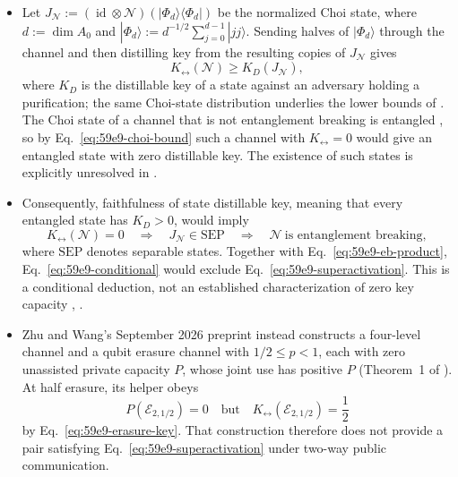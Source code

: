 \begin{itemize}
  \item Let $J_{\mathcal N}:=(\operatorname{id}\otimes\mathcal N)(|\Phi_d\rangle\langle\Phi_d|)$
  be the normalized Choi state, where $d:=\dim A_0$ and
  $|\Phi_d\rangle:=d^{-1/2}\sum_{j=0}^{d-1}|jj\rangle$.  Sending halves of
  $|\Phi_d\rangle$ through the channel and then distilling key from the
  resulting copies of $J_{\mathcal N}$ gives
  \begin{equation}
    K_{\leftrightarrow}(\mathcal N)\geq K_D(J_{\mathcal N}),
    \label{eq:59e9-choi-bound}
  \end{equation}
  where $K_D$ is the distillable key of a state against an adversary holding
  a purification; the same Choi-state distribution underlies the lower bounds
  of .  The Choi state of a channel that is
  not entanglement breaking is entangled , so
  by Eq.~\eqref{eq:59e9-choi-bound} such a channel with
  $K_{\leftrightarrow}=0$ would give an entangled state with zero
  distillable key.  The existence of such states is explicitly unresolved in
  .

  \item Consequently, faithfulness of state distillable key, meaning that every
  entangled state has $K_D>0$, would imply
  \begin{equation}
    K_{\leftrightarrow}(\mathcal N)=0
    \quad\Longrightarrow\quad
    J_{\mathcal N}\in\mathrm{SEP}
    \quad\Longrightarrow\quad
    \mathcal N\ \text{is entanglement breaking},
    \label{eq:59e9-conditional}
  \end{equation}
  where $\mathrm{SEP}$ denotes separable states.  Together with
  Eq.~\eqref{eq:59e9-eb-product}, Eq.~\eqref{eq:59e9-conditional} would
  exclude Eq.~\eqref{eq:59e9-superactivation}.  This is a conditional
  deduction, not an established characterization of zero key capacity
  , .

  \item Zhu and Wang's September 2026 preprint instead constructs a four-level
  channel and a qubit erasure channel with $1/2\leq p<1$, each with zero
  unassisted private capacity $P$, whose joint use has positive $P$
  (Theorem~1 of ).  At half erasure, its helper
  obeys
  \begin{equation}
    P(\mathcal E_{2,1/2})=0
    \quad\text{but}\quad
    K_{\leftrightarrow}(\mathcal E_{2,1/2})=\frac12
    \label{eq:59e9-private-helper}
  \end{equation}
  by Eq.~\eqref{eq:59e9-erasure-key}.  That construction therefore does not
  provide a pair satisfying Eq.~\eqref{eq:59e9-superactivation} under
  two-way public communication.
\end{itemize}

